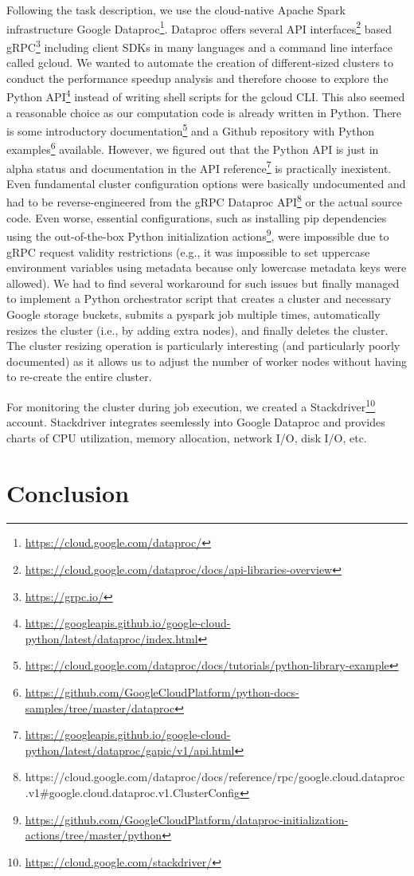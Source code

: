 \documentclass{prog_report}
\newcommand{\footurl}[1]{\footnote{\url{#1}}}
\begin{document}
Following the task description, we use the cloud-native Apache Spark infrastructure Google Dataproc\footurl{https://cloud.google.com/dataproc/}.
Dataproc offers several API interfaces\footurl{https://cloud.google.com/dataproc/docs/api-libraries-overview} based gRPC\footurl{https://grpc.io/} including client SDKs in many languages and a command line interface called gcloud.
We wanted to automate the creation of different-sized clusters to conduct the performance speedup analysis and therefore choose to explore the Python API\footurl{https://googleapis.github.io/google-cloud-python/latest/dataproc/index.html} instead of writing shell scripts for the gcloud CLI.
This also seemed a reasonable choice as our computation code is already written in Python.
There is some introductory documentation\footurl{https://cloud.google.com/dataproc/docs/tutorials/python-library-example} and a Github repository with Python examples\footurl{https://github.com/GoogleCloudPlatform/python-docs-samples/tree/master/dataproc} available.
However, we figured out that the Python API is just in alpha status and documentation in the API reference\footurl{https://googleapis.github.io/google-cloud-python/latest/dataproc/gapic/v1/api.html} is practically inexistent.
Even fundamental cluster configuration options were basically undocumented and had to be reverse-engineered from the gRPC Dataproc API\footnote{https://cloud.google.com/dataproc/docs/reference/rpc/google.cloud.dataproc.v1\#google.cloud.dataproc.v1.ClusterConfig} or the actual source code.
Even worse, essential configurations, such as installing pip dependencies using the out-of-the-box Python initialization actions\footurl{https://github.com/GoogleCloudPlatform/dataproc-initialization-actions/tree/master/python}, were impossible due to gRPC request validity restrictions (e.g., it was impossible to set uppercase environment variables using metadata because only lowercase metadata keys were allowed).
We had to find several workaround for such issues but finally managed to implement a Python orchestrator script that creates a cluster and necessary Google storage buckets, submits a pyspark job multiple times, automatically resizes the cluster (i.e., by adding extra nodes), and finally deletes the cluster.
The cluster resizing operation is particularly interesting (and particularly poorly documented) as it allows us to adjust the number of worker nodes without having to re-create the entire cluster.

For monitoring the cluster during job execution, we created a Stackdriver\footurl{https://cloud.google.com/stackdriver/} account.
Stackdriver integrates seemlessly into Google Dataproc and provides charts of CPU utilization, memory allocation, network I/O, disk I/O, etc.

\section{Conclusion}



\end{document}
